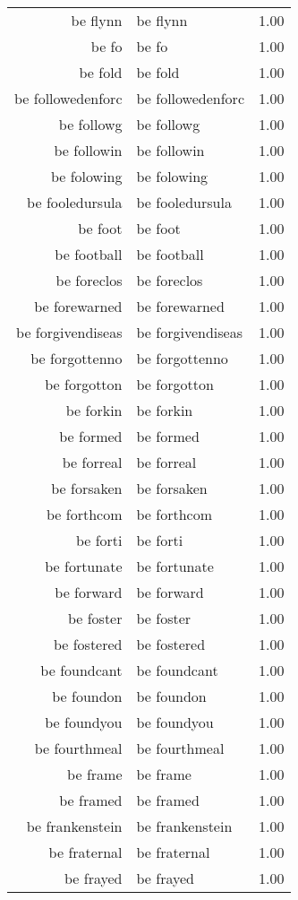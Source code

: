 \begin{table}[ht]
\begin{tabular}{rlr}
  be flynn & be flynn & 1.00 \\ 
  be fo & be fo & 1.00 \\ 
  be fold & be fold & 1.00 \\ 
  be followedenforc & be followedenforc & 1.00 \\ 
  be followg & be followg & 1.00 \\ 
  be followin & be followin & 1.00 \\ 
  be folowing & be folowing & 1.00 \\ 
  be fooledursula & be fooledursula & 1.00 \\ 
  be foot & be foot & 1.00 \\ 
  be football & be football & 1.00 \\ 
  be foreclos & be foreclos & 1.00 \\ 
  be forewarned & be forewarned & 1.00 \\ 
  be forgivendiseas & be forgivendiseas & 1.00 \\ 
  be forgottenno & be forgottenno & 1.00 \\ 
  be forgotton & be forgotton & 1.00 \\ 
  be forkin & be forkin & 1.00 \\ 
  be formed & be formed & 1.00 \\ 
  be forreal & be forreal & 1.00 \\ 
  be forsaken & be forsaken & 1.00 \\ 
  be forthcom & be forthcom & 1.00 \\ 
  be forti & be forti & 1.00 \\ 
  be fortunate & be fortunate & 1.00 \\ 
  be forward & be forward & 1.00 \\ 
  be foster & be foster & 1.00 \\ 
  be fostered & be fostered & 1.00 \\ 
  be foundcant & be foundcant & 1.00 \\ 
  be foundon & be foundon & 1.00 \\ 
  be foundyou & be foundyou & 1.00 \\ 
  be fourthmeal & be fourthmeal & 1.00 \\ 
  be frame & be frame & 1.00 \\ 
  be framed & be framed & 1.00 \\ 
  be frankenstein & be frankenstein & 1.00 \\ 
  be fraternal & be fraternal & 1.00 \\ 
  be frayed & be frayed & 1.00 \\ 

\end{tabular}
\end{table}
